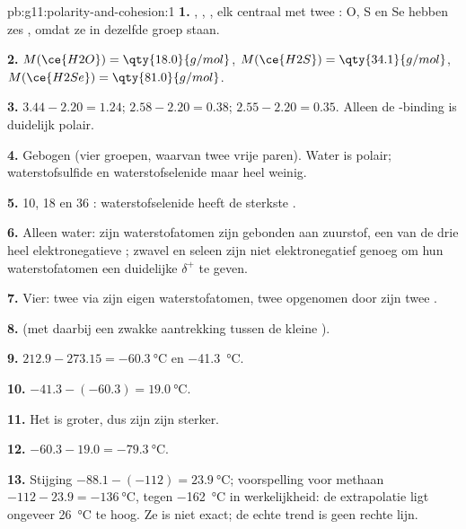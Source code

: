 \begin{solution}{pb:g11:polarity-and-cohesion:1}
\textbf{1.} , , , elk centraal  met
twee : O, S en Se hebben zes ,
omdat ze in dezelfde groep staan.

\textbf{2.} $M(\ce{H2O}) = \qty{18.0}{g/mol}$, $M(\ce{H2S}) =
\qty{34.1}{g/mol}$, $M(\ce{H2Se}) = \qty{81.0}{g/mol}$.

\textbf{3.} $3.44 - 2.20 = 1.24$; $2.58 - 2.20 = 0.38$;
$2.55 - 2.20 = 0.35$. Alleen de -binding is duidelijk polair.

\textbf{4.} Gebogen (vier groepen, waarvan twee vrije paren). Water is
polair; waterstofsulfide en waterstofselenide maar heel weinig.

\textbf{5.} 10, 18 en 36 : waterstofselenide heeft de sterkste
.

\textbf{6.} Alleen water: zijn waterstofatomen zijn gebonden aan
zuurstof, een van de drie heel elektronegatieve ; zwavel en seleen
zijn niet elektronegatief genoeg om hun waterstofatomen een duidelijke
$\delta^+$ te geven.

\textbf{7.} Vier: twee via zijn eigen waterstofatomen, twee opgenomen
door zijn twee .

\textbf{8.}  (met daarbij een zwakke aantrekking
tussen de kleine ).

\textbf{9.} $212.9 - 273.15 = \qty{-60.3}{\celsius}$ en
\qty{-41.3}{\celsius}.

\textbf{10.} $-41.3 - (-60.3) = \qty{19.0}{\celsius}$.

\textbf{11.} Het  is groter, dus zijn  zijn
sterker.

\textbf{12.} $-60.3 - 19.0 = \qty{-79.3}{\celsius}$.

\textbf{13.} Stijging $-88.1 - (-112) = \qty{23.9}{\celsius}$; voorspelling
voor methaan $-112 - 23.9 = \qty{-136}{\celsius}$, tegen
\qty{-162}{\celsius} in werkelijkheid: de extrapolatie ligt ongeveer
\qty{26}{\celsius} te hoog. Ze is niet exact; de echte trend is geen
rechte lijn.


\end{solution}
